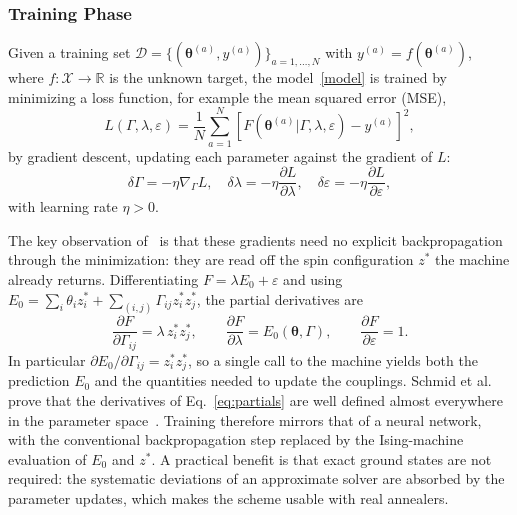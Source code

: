 \documentclass{ieeeaccess}
\begin{document}
\subsubsection{Training Phase}\label{sec:training_bg}

Given a training set $\mathcal{D} = \{(\boldsymbol{\theta}^{(a)}, y^{(a)})\}_{a=1,\ldots,N}$
with $y^{(a)} = f(\boldsymbol{\theta}^{(a)})$, where $f : \mathcal{X} \rightarrow \mathbb{R}$
is the unknown target, the model~\eqref{model} is trained by minimizing a
loss function, for example the mean squared error (MSE),
\begin{equation}
L(\Gamma, \lambda, \varepsilon) = \frac{1}{N} \sum_{a=1}^{N}
\left[ F(\boldsymbol{\theta}^{(a)} | \Gamma, \lambda, \varepsilon) - y^{(a)} \right]^2,
\label{eq:loss}
\end{equation}
by gradient descent, updating each parameter against the gradient of $L$:
\begin{equation}
\delta \Gamma = -\eta \nabla_{\Gamma} L, \quad
\delta \lambda = -\eta \frac{\partial L}{\partial \lambda}, \quad
\delta \varepsilon = -\eta \frac{\partial L}{\partial \varepsilon},
\label{eq:gradients}
\end{equation}
with learning rate $\eta > 0$.

The key observation of~\cite{10.21468/SciPostPhysCore.7.1.013} is that these gradients
need no explicit backpropagation through the minimization: they are read off
the spin configuration $z^*$ the machine already returns.
Differentiating
$F = \lambda E_0 + \varepsilon$ and using $E_0 = \sum_i \theta_i z^*_i + \sum_{(i,j)} \Gamma_{ij} z^*_i z^*_j$,
the partial derivatives are
\begin{equation}
\frac{\partial F}{\partial \Gamma_{ij}} = \lambda\, z^*_i z^*_j, \qquad
\frac{\partial F}{\partial \lambda} = E_0(\boldsymbol{\theta}, \Gamma), \qquad
\frac{\partial F}{\partial \varepsilon} = 1.
\label{eq:partials}
\end{equation}
In particular $\partial E_0 / \partial \Gamma_{ij} = z^*_i z^*_j$, so a single
call to the machine yields both the prediction $E_0$ and the quantities needed
to update the couplings. Schmid et al. prove that the derivatives of
Eq.~\eqref{eq:partials} are well defined almost everywhere in the parameter
space~\cite{10.21468/SciPostPhysCore.7.1.013}. Training
therefore mirrors that of a neural network, with the conventional
backpropagation step replaced by the Ising-machine evaluation of $E_0$ and
$z^*$. A practical benefit is that exact ground states are not required: the
systematic deviations of an approximate solver are absorbed by the parameter
updates, which makes the scheme usable with real annealers.
\end{document}
